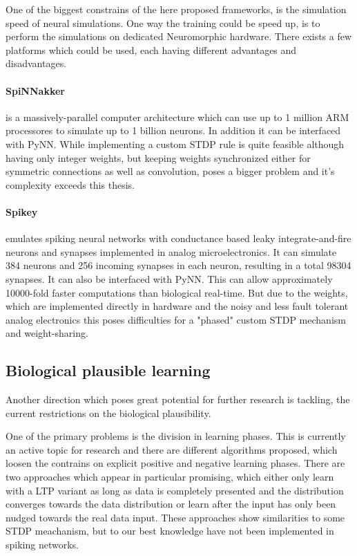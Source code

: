 One of the biggest constrains of the here proposed frameworks, is the simulation speed of neural simulations.
One way the training could be speed up, is to perform the simulations on dedicated Neuromorphic hardware. 
There exists a few platforms which could be used, each having different advantages and disadvantages.

\paragraph{SpiNNakker} is a massively-parallel computer architecture which can use up to 1 million ARM processores to simulate up to 1 billion neurons. 
In addition it can be interfaced with PyNN. 
While implementing a custom STDP rule is quite feasible although having only integer weights, but keeping weights synchronized either for symmetric connections as well as convolution, poses a bigger problem and it's complexity exceeds this thesis.

\paragraph{Spikey} emulates spiking neural networks with conductance based leaky integrate-and-fire neurons and synapses implemented in analog microelectronics.
It can simulate 384 neurons and 256 incoming synapses in each neuron, resulting in a total 98304 synapses.
It can also be interfaced with PyNN.
This can allow approximately 10000-fold faster computations than biological real-time.
But due to the weights, which are implemented directly in hardware and the noisy and less fault tolerant analog electronics this poses difficulties for a "phased" custom STDP mechanism and weight-sharing. 

\subsection{Biological plausible learning}

Another direction which poses great potential for further research is tackling, the current restrictions on the biological plausibility.  

One of the primary problems is the division in learning phases.
This is currently an active topic for research and there are different algorithms proposed, which loosen the contrains on explicit positive and negative learning phases.
There are two approaches which appear in particular promising, which either only learn with a LTP variant as long as data is completely presented and the distribution converges towards the data distribution or learn after the input has only been nudged towards the real data input.
These approaches show similarities to some STDP meachanism, but to our best knowledge have not been implemented in spiking networks.

